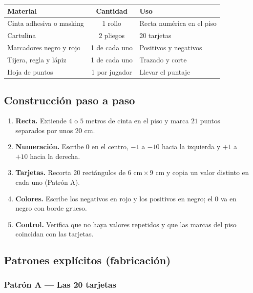 \documentclass[12pt, letterpaper]{article}
\begin{document}
\begin{center}
\small
\begin{tabular}{@{}p{5.0cm} c p{7.4cm}@{}}
\toprule
\textbf{Material} & \textbf{Cantidad} & \textbf{Uso}\\
\midrule
Cinta adhesiva o masking & 1 rollo & Recta numérica en el piso\\
Cartulina & 2 pliegos & 20 tarjetas\\
Marcadores negro y rojo & 1 de cada uno & Positivos y negativos\\
Tijera, regla y lápiz & 1 de cada uno & Trazado y corte\\
Hoja de puntos & 1 por jugador & Llevar el puntaje\\
\bottomrule
\end{tabular}
\end{center}

\subsection{Construcción paso a paso}

\begin{enumerate}[leftmargin=*]
  \item \textbf{Recta.} Extiende $4$ o $5$ metros de cinta en el piso y marca $21$ puntos separados por unos $20$ cm.
  \item \textbf{Numeración.} Escribe $0$ en el centro, $-1$ a $-10$ hacia la izquierda y $+1$ a $+10$ hacia la derecha.
  \item \textbf{Tarjetas.} Recorta 20 rectángulos de $6\text{ cm}\times 9\text{ cm}$ y copia un valor distinto en cada uno (Patrón A).
  \item \textbf{Colores.} Escribe los negativos en rojo y los positivos en negro; el $0$ va en negro con borde grueso.
  \item \textbf{Control.} Verifica que no haya valores repetidos y que las marcas del piso coincidan con las tarjetas.
\end{enumerate}

\subsection{Patrones explícitos (fabricación)}

\subsubsection{Patrón A — Las 20 tarjetas}
\end{document}
